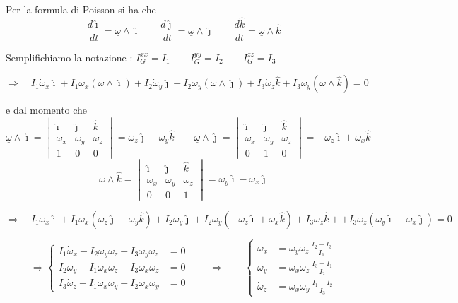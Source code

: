 Per la formula di Poisson si ha che
\[
\frac{d\hat{\imath}}{dt}=\underline{\omega}\wedge\hat{\imath}
\qquad
\frac{d\hat{\jmath}}{dt}=\underline{\omega}\wedge\hat{\jmath}
\qquad
\frac{d\hat{k}}{dt}=\underline{\omega}\wedge\hat{k}
\]

Semplifichiamo la notazione : \quad $I_G^{xx}=I_1 \qquad I_G^{yy}=I_2 \qquad I_G^{zz}=I_3$

\[
\Rightarrow\quad
I_1\dot{\omega}_x\hat{\imath}
+I_1\omega_x(\underline{\omega}\wedge\hat{\imath})
+I_2\dot{\omega}_y\hat{\jmath}
+I_2\omega_y(\underline{\omega}\wedge\hat{\jmath})
+I_3\dot{\omega}_z\hat{k}
+I_3\omega_y(\underline{\omega}\wedge\hat{k})
=0
\]

e dal momento che
\[
\underline{\omega}\wedge\hat{\imath}
=
\begin{vmatrix}
\hat{\imath} & \hat{\jmath} & \hat{k}\\
\omega_x & \omega_y & \omega_z\\
1 & 0 & 0
\end{vmatrix}
= \omega_z\hat{\jmath}-\omega_y\hat{k}
\qquad
\underline{\omega}\wedge\hat{\jmath}
=
\begin{vmatrix}
\hat{\imath} & \hat{\jmath} & \hat{k}\\
\omega_x & \omega_y & \omega_z\\
0 & 1 & 0
\end{vmatrix}
= -\omega_z\hat{\imath}+\omega_x\hat{k}
\]
\[
\underline{\omega}\wedge\hat{k}
=
\begin{vmatrix}
\hat{\imath} & \hat{\jmath} & \hat{k}\\
\omega_x & \omega_y & \omega_z\\
0 & 0 & 1
\end{vmatrix}
= \omega_y\hat{\imath}-\omega_x\hat{\jmath}
\]

\[
\Rightarrow\quad
I_1\dot{\omega}_x\hat{\imath}
+I_1\omega_x(\omega_z\hat{\jmath}-\omega_y\hat{k})
+I_2\dot{\omega}_y\hat{\jmath}
+I_2\omega_y(-\omega_z\hat{\imath}+\omega_x\hat{k})
+I_3\dot{\omega}_z\hat{k}
+
+I_3\omega_z(\omega_y\hat{\imath}-\omega_x\hat{\jmath})
=0
\]

\[
\Rightarrow
\left\{
\begin{aligned}
I_1\dot{\omega}_x - I_2\omega_y\omega_z + I_3\omega_y\omega_z &= 0\\
I_2\dot{\omega}_y + I_1\omega_x\omega_z - I_3\omega_x\omega_z &= 0\\
I_3\dot{\omega}_z - I_1\omega_x\omega_y + I_2\omega_x\omega_y &= 0
\end{aligned}
\right.
\qquad \Rightarrow \qquad
\left\{
\begin{aligned}
\dot{\omega}_x &= \omega_y\omega_z\,\frac{I_2-I_3}{I_1}\\
\dot{\omega}_y &= \omega_x\omega_z\,\frac{I_3-I_1}{I_2}\\
\dot{\omega}_z &= \omega_x\omega_y\,\frac{I_1-I_2}{I_3}
\end{aligned}
\right.
\]

